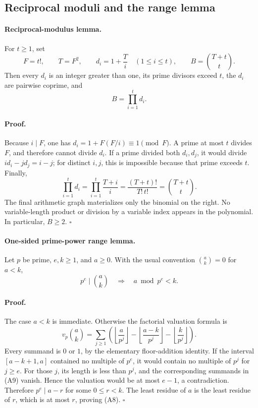 \subsection{Reciprocal moduli and the range lemma}

\paragraph{Reciprocal-modulus lemma.}
For \(t\ge1\), set
\[
 F=t!,\qquad T=F^2,\qquad
 d_i=1+\frac{T}{i}\quad(1\le i\le t),\qquad
 B=\binom{T+t}{t}.                                      \tag{A6}
\]
Then every \(d_i\) is an integer greater than one, its prime divisors
exceed \(t\), the \(d_i\) are pairwise coprime, and
\[
 B=\prod_{i=1}^{t}d_i.                                  \tag{A7}
\]

\paragraph{Proof.}
Because \(i\mid F\), one has
\(d_i=1+F(F/i)\equiv1\pmod F\).  A prime at most \(t\)
divides \(F\), and therefore cannot divide \(d_i\).
If a prime divided both \(d_i,d_j\), it would divide
\(id_i-jd_j=i-j\); for distinct \(i,j\), this is impossible
because that prime exceeds \(t\).  Finally,
\[
 \prod_{i=1}^{t}d_i
 =\prod_{i=1}^{t}\frac{T+i}{i}
 =\frac{(T+t)!}{T!\,t!}
 =\binom{T+t}{t}.
\]
The final arithmetic graph materializes only the binomial on the right.
No variable-length product or division by a variable index appears in
the polynomial.  In particular, \(B\ge2\).
\hfill\(\square\)

\paragraph{One-sided prime-power range lemma.}
Let \(p\) be prime, \(e,k\ge1\), and \(a\ge0\).  With the usual convention
\(\binom ak=0\) for \(a<k\),
\[
 p^e\mid\binom ak\quad\Longrightarrow\quad
 a\bmod p^e<k.                                         \tag{A8}
\]

\paragraph{Proof.}
The case \(a<k\) is immediate.  Otherwise the factorial valuation formula is
\[
 v_p\binom ak=
 \sum_{j\ge1}\left(
 \left\lfloor\frac a{p^j}\right\rfloor
 -\left\lfloor\frac {a-k}{p^j}\right\rfloor
 -\left\lfloor\frac k{p^j}\right\rfloor\right).           \tag{A9}
\]
Every summand is \(0\) or \(1\), by the elementary floor-addition identity.
If the interval \([a-k+1,a]\) contained no multiple of \(p^e\),
it would contain no multiple of \(p^j\) for \(j\ge e\).
For those \(j\), its length is less than \(p^j\), and the corresponding
summands in (A9) vanish.  Hence the valuation would be at most \(e-1\),
a contradiction.  Therefore \(p^e\mid a-r\) for some \(0\le r<k\).
The least residue of \(a\) is the least residue of \(r\), which is at
most \(r\), proving (A8).
\hfill\(\square\)

